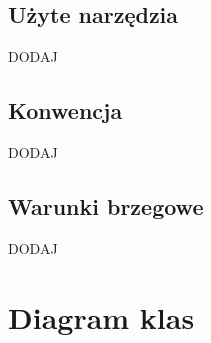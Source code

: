 \documentclass[]{article}
\begin{document}
    \subsection{Użyte narzędzia}
    DODAJ

    \subsection{Konwencja}
    DODAJ

    \subsection{Warunki brzegowe}
    DODAJ


    \section{Diagram klas}

    \noindent
\end{document}
